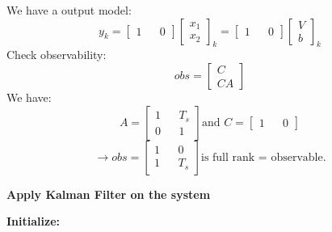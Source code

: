 	We have a output model:
	\begin{equation}
		\boxed{
			y_k = 
			\begin{bmatrix}
				1 &   & 0 
			\end{bmatrix}
			\begin{bmatrix}
				x_1 \\
				x_2 
			\end{bmatrix}_k = 
			\begin{bmatrix}
				1 &   & 0 
			\end{bmatrix}
			\begin{bmatrix}
				V \\
				b 
			\end{bmatrix}_k
		}
		\label{sensorfuseq11}
	\end{equation}
	Check observability:
	\[obs = 
	\begin{bmatrix}
		C  \\
		CA 
	\end{bmatrix}\]
	We have:
	\[A = 
	\begin{bmatrix}
		1 &   & T_s \\
		0 &   & 1   
	\end{bmatrix} \text{and } C = 
	\begin{bmatrix}
		1 &   & 0 
	\end{bmatrix}\]
	\[\rightarrow obs = 
	\begin{bmatrix}
		1 &   & 0   \\
		1 &   & T_s 
	\end{bmatrix} \text{is full rank = observable.}\]
	\begin{center}
		\textbf{Apply Kalman Filter on the system}
	\end{center}
	\textbf{Initialize:}
